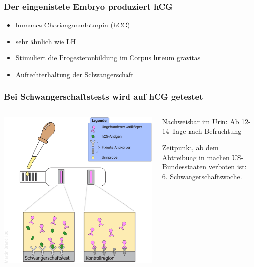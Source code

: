 \documentclass{beamer}
\begin{document}
\begin{frame}
\frametitle{Der  eingenistete Embryo produziert hCG}

\begin{itemize}
    \item 
    humanes Choriongonadotropin (hCG)
    \item 
    sehr ähnlich wie LH
    \item
    Stimuliert die Progesteronbildung im Corpus luteum gravitas
    \item
    Aufrechterhaltung der Schwangerschaft
    
\end{itemize}


\end{frame}


\begin{frame}
\frametitle{Bei Schwangerschaftstests wird auf hCG getestet}

\begin{columns}[c]



\begin{column}{5cm}
\includegraphics[width=\textwidth]{Schwangerschaftstest_Schema.png}
\end{column}


\begin{column}{5cm}

Nachweisbar im Urin: Ab 12-14 Tage nach Befruchtung 

\pause

Zeitpunkt, ab dem Abtreibung in machen US-Bundesstaaten verboten ist: 6. Schwangerschaftswoche.  




\end{column}

\end{columns}

\end{frame}
\end{document}
